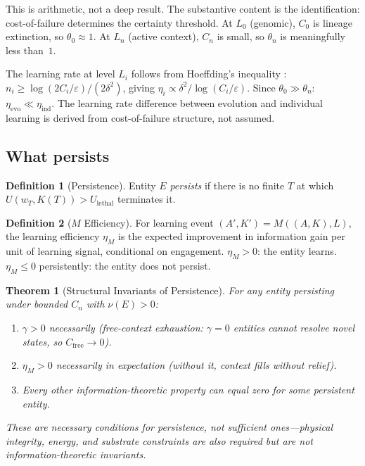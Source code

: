 \documentclass[11pt]{article}
\newtheorem{theorem}{Theorem}
\theoremstyle{definition}
\newtheorem{definition}{Definition}
\theoremstyle{remark}
\begin{document}
This is arithmetic, not a deep result. The substantive content is the
identification: cost-of-failure determines the certainty threshold.
At $L_0$ (genomic), $C_0$ is lineage extinction, so
$\theta_0 \approx 1$. At $L_n$ (active context), $C_n$ is small, so
$\theta_n$ is meaningfully less than~$1$.

The learning rate at level $L_i$ follows from Hoeffding's inequality
\cite{Hoeffding1963}:
$n_i \geq \log(2 C_i / \varepsilon) / (2\delta^2)$,
giving $\eta_i \propto \delta^2 / \log(C_i / \varepsilon)$.
Since $\theta_0 \gg \theta_n$:
$\eta_{\mathrm{evo}} \ll \eta_{\mathrm{ind}}$.
The learning rate difference between evolution and individual learning
is derived from cost-of-failure structure, not assumed.

\subsection{What persists}

\begin{definition}[Persistence]
\label{def:persistence}
Entity $E$ \emph{persists} if there is no finite $T$ at which
$U(w_T, K(T)) > U_{\mathrm{lethal}}$ terminates it.
\end{definition}

\begin{definition}[$M$ Efficiency]
\label{def:eta}
For learning event $(A', K') = M((A, K), L)$, the learning efficiency
$\eta_M$ is the expected improvement in information gain per unit of
learning signal, conditional on engagement. $\eta_M > 0$: the entity
learns. $\eta_M \leq 0$ persistently: the entity does not persist.
\end{definition}

\begin{theorem}[Structural Invariants of Persistence]
\label{thm:invariants}
For any entity persisting under bounded $C_n$ with $\nu(E) > 0$:
\begin{enumerate}
\item[(i)] $\gamma > 0$ necessarily (free-context exhaustion:
   $\gamma = 0$ entities cannot resolve novel states, so
   $C_{\mathrm{free}} \to 0$).
\item[(ii)] $\eta_M > 0$ necessarily in expectation (without it,
   context fills without relief).
\item[(iii)] Every other information-theoretic property can equal zero
   for some persistent entity.
\end{enumerate}
These are necessary conditions for persistence, not sufficient
ones---physical integrity, energy, and substrate constraints are also
required but are not information-theoretic invariants.
\end{theorem}
\end{document}
